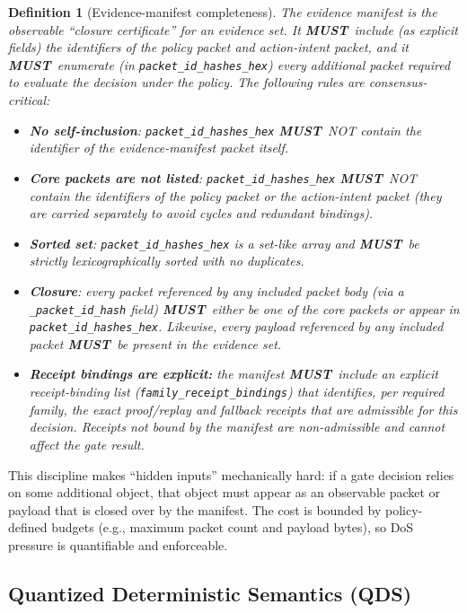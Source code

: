 \documentclass[11pt]{article}
\newcommand{\MUST}{\textbf{MUST}}
\newtheorem{definition}{Definition}
\begin{document}
\begin{definition}[Evidence-manifest completeness]\label{def:manifestrule}
The evidence manifest is the observable ``closure certificate'' for an evidence set.
It \MUST\ include (as explicit fields) the identifiers of the policy packet and action-intent packet, and it \MUST\ enumerate (in \texttt{packet\_id\_hashes\_hex}) every additional packet required to evaluate the decision under the policy.
The following rules are consensus-critical:
\begin{itemize}[leftmargin=1.2em]
  \item \textbf{No self-inclusion}: \texttt{packet\_id\_hashes\_hex} \MUST\ NOT contain the identifier of the evidence-manifest packet itself.
  \item \textbf{Core packets are not listed}: \texttt{packet\_id\_hashes\_hex} \MUST\ NOT contain the identifiers of the policy packet or the action-intent packet (they are carried separately to avoid cycles and redundant bindings).
  \item \textbf{Sorted set}: \texttt{packet\_id\_hashes\_hex} is a set-like array and \MUST\ be strictly lexicographically sorted with no duplicates.
  \item \textbf{Closure}: every packet referenced by any included packet body (via a \texttt{\_packet\_id\_hash} field) \MUST\ either be one of the core packets or appear in \texttt{packet\_id\_hashes\_hex}. Likewise, every payload referenced by any included packet \MUST\ be present in the evidence set.
  \item \textbf{Receipt bindings are explicit:} the manifest \MUST\ include an explicit receipt-binding list (\texttt{family\_receipt\_bindings}) that identifies, per required family, the exact proof/replay and fallback receipts that are admissible for this decision. Receipts not bound by the manifest are non-admissible and cannot affect the gate result.
\end{itemize}
\end{definition}

This discipline makes ``hidden inputs'' mechanically hard: if a gate decision relies on some additional object, that object must appear as an observable packet or payload that is closed over by the manifest.
The cost is bounded by policy-defined budgets (e.g., maximum packet count and payload bytes), so DoS pressure is quantifiable and enforceable.


\subsection{Quantized Deterministic Semantics (QDS)}\label{sec:qds}
\end{document}
